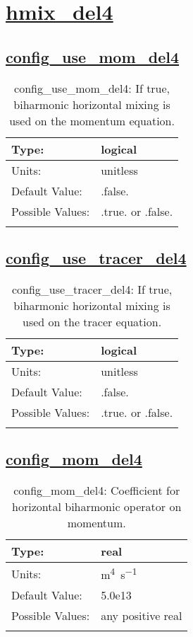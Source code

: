 \section[hmix\_del4]{\hyperref[sec:nm_tab_hmix_del4]{hmix\_del4}}
\label{sec:nm_sec_hmix_del4}
\subsection[config\_use\_mom\_del4]{\hyperref[sec:nm_tab_hmix_del4]{config\_use\_mom\_del4}}
\label{subsec:nm_sec_config_use_mom_del4}
\begin{center}
\begin{longtable}{| p{2.0in} || p{4.0in} |}
    \hline
    Type: & logical \\
    \hline
    Units: & \si{unitless} \\
    \hline
    Default Value: & .false. \\
    \hline
    Possible Values: & .true. or .false. \\
    \hline
    \caption{config\_use\_mom\_del4: If true, biharmonic horizontal mixing is used on the momentum equation.}
\end{longtable}
\end{center}
\subsection[config\_use\_tracer\_del4]{\hyperref[sec:nm_tab_hmix_del4]{config\_use\_tracer\_del4}}
\label{subsec:nm_sec_config_use_tracer_del4}
\begin{center}
\begin{longtable}{| p{2.0in} || p{4.0in} |}
    \hline
    Type: & logical \\
    \hline
    Units: & \si{unitless} \\
    \hline
    Default Value: & .false. \\
    \hline
    Possible Values: & .true. or .false. \\
    \hline
    \caption{config\_use\_tracer\_del4: If true, biharmonic horizontal mixing is used on the tracer equation.}
\end{longtable}
\end{center}
\subsection[config\_mom\_del4]{\hyperref[sec:nm_tab_hmix_del4]{config\_mom\_del4}}
\label{subsec:nm_sec_config_mom_del4}
\begin{center}
\begin{longtable}{| p{2.0in} || p{4.0in} |}
    \hline
    Type: & real \\
    \hline
    Units: & \si{m^4.s^{-1}} \\
    \hline
    Default Value: & 5.0e13 \\
    \hline
    Possible Values: & any positive real \\
    \hline
    \caption{config\_mom\_del4: Coefficient for horizontal biharmonic operator on momentum.}
\end{longtable}
\end{center}
